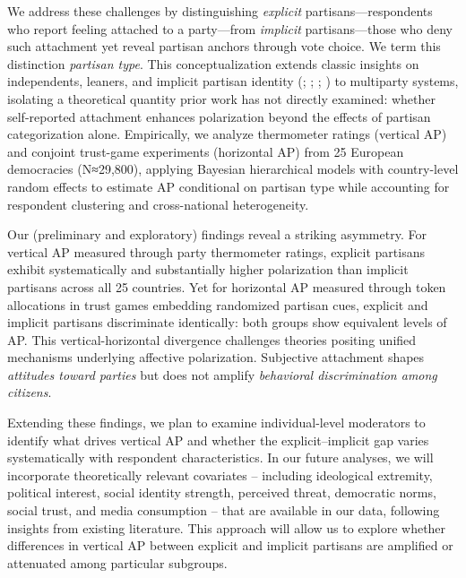 \documentclass[
  12pt,
  a4paper,
  DIV=11,
  numbers=noendperiod]{scrartcl}
\begin{document}
We address these challenges by distinguishing \emph{explicit}
partisans---respondents who report feeling attached to a party---from
\emph{implicit} partisans---those who deny such attachment yet reveal
partisan anchors through vote choice. We term this distinction
\emph{partisan type}. This conceptualization extends classic insights on
independents, leaners, and implicit partisan identity
(;
;
;
) to multiparty systems,
isolating a theoretical quantity prior work has not directly examined:
whether self-reported attachment enhances polarization beyond the
effects of partisan categorization alone. Empirically, we analyze
thermometer ratings (vertical AP) and conjoint trust-game experiments
(horizontal AP) from 25 European democracies (N≈29,800), applying
Bayesian hierarchical models with country-level random effects to
estimate AP conditional on partisan type while accounting for respondent
clustering and cross-national heterogeneity.

Our (preliminary and exploratory) findings reveal a striking asymmetry.
For vertical AP measured through party thermometer ratings, explicit
partisans exhibit systematically and substantially higher polarization
than implicit partisans across all 25 countries. Yet for horizontal AP
measured through token allocations in trust games embedding randomized
partisan cues, explicit and implicit partisans discriminate identically:
both groups show equivalent levels of AP. This vertical-horizontal
divergence challenges theories positing unified mechanisms underlying
affective polarization. Subjective attachment shapes \emph{attitudes
toward parties} but does not amplify \emph{behavioral discrimination
among citizens}.

Extending these findings, we plan to examine individual-level moderators
to identify what drives vertical AP and whether the explicit--implicit
gap varies systematically with respondent characteristics. In our future
analyses, we will incorporate theoretically relevant covariates --
including ideological extremity, political interest, social identity
strength, perceived threat, democratic norms, social trust, and media
consumption -- that are available in our data, following insights from
existing literature. This approach will allow us to explore whether
differences in vertical AP between explicit and implicit partisans are
amplified or attenuated among particular subgroups.
\end{document}
